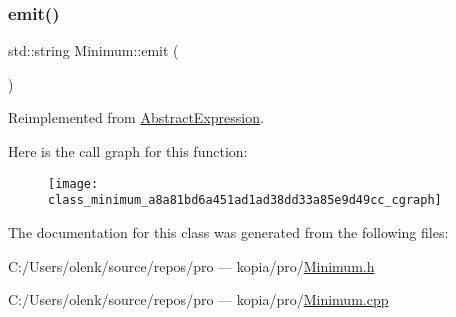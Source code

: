 \subsubsection{\texorpdfstring{emit()}{emit()}}
{\footnotesize\ttfamily std\+::string Minimum\+::emit (\begin{DoxyParamCaption}{ }\end{DoxyParamCaption})\hspace{0.3cm}{\ttfamily [virtual]}}



Reimplemented from \mbox{\hyperlink{class_abstract_expression_a9f19c05e663491688cdf4423e002a391}{Abstract\+Expression}}.

Here is the call graph for this function\+:
\nopagebreak
\begin{figure}[H]
\begin{center}
\leavevmode
\texttt{[image: class\_minimum\_a8a81bd6a451ad1ad38dd33a85e9d49cc\_cgraph]}
\end{center}
\end{figure}


The documentation for this class was generated from the following files\+:\begin{DoxyCompactItemize}
\item 
C\+:/\+Users/olenk/source/repos/pro — kopia/pro/\mbox{\hyperlink{_minimum_8h}{Minimum.\+h}}\item 
C\+:/\+Users/olenk/source/repos/pro — kopia/pro/\mbox{\hyperlink{_minimum_8cpp}{Minimum.\+cpp}}\end{DoxyCompactItemize}
